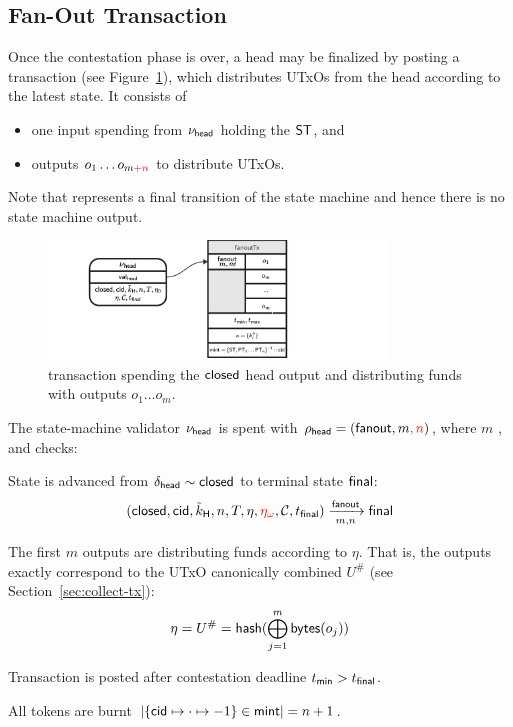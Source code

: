 \subsection{Fan-Out Transaction}

Once the contestation phase is over, a head may be finalized by posting a
\mtxFanout{} transaction (see Figure~\ref{fig:fanoutTx}), which
distributes UTxOs from the head according to the latest state. It consists of
\begin{itemize}
	\item one input spending from $\nu_\mathsf{head}$ holding the $\mathsf{ST}$, and
	\item outputs $o_{1} \dots o_{m\textcolor{red}{+n}}$ to distribute UTxOs.
\end{itemize}

Note that \mtxFanout{} represents a final transition of the state machine and
hence there is no state machine output.

\begin{figure}
	\centering
	\includegraphics[width=0.8\textwidth]{figures/fanoutTx.pdf}
	\caption{\mtxFanout{} transaction spending the $\mathsf{closed}$ head output and
		distributing funds with outputs $o_{1} \dots o_{m}$.}\label{fig:fanoutTx}
\end{figure}

\noindent The state-machine validator $\nu_\mathsf{head}$ is spent with
$\rho_{\mathsf{head}} = (\mathsf{fanout}, m\textcolor{red}{, n})$, where $m$ , and checks:
\begin{menumerate}
	\item State is advanced from $\delta_{\mathsf{head}} \sim \mathsf{closed}$ to terminal state
	$\mathsf{final}$: %
	\[
		(\mathsf{closed},\mathsf{cid},\tilde{k}_{\mathsf{H}},n,T,\eta,\textcolor{red}{\eta_{\omega}},\mathcal{C},t_{\mathsf{final}}) \xrightarrow[m,n]{\mathsf{fanout}} \mathsf{final}
	\]
	\item The first $m$ outputs are distributing funds according to $\eta$. That is,
	the outputs exactly correspond to the UTxO canonically combined $U^{\#}$ (see
	Section~\ref{sec:collect-tx}):
	\[
		\eta = U^{\#} = \mathsf{hash}(\bigoplus_{j=1}^{m} \mathsf{bytes}(o_{j}))
	\]
	\item Transaction is posted after contestation deadline $t_{\mathsf{min}} > t_{\mathsf{final}}$.
	\item All tokens are burnt
	$|\{\mathsf{cid} \mapsto \cdot \mapsto -1\} \in \mathsf{mint}| = n + 1$.
\end{menumerate}

